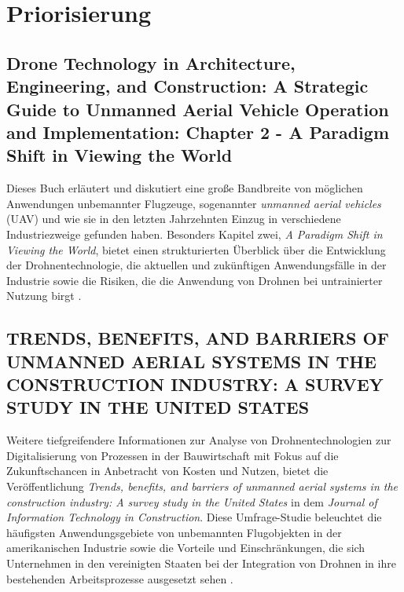 \chapter{Priorisierung}\label{ch:priorisation}

\section{Drone Technology in Architecture, Engineering, and Construction: A Strategic Guide to Unmanned Aerial Vehicle Operation and Implementation: Chapter 2 - A Paradigm Shift in Viewing the World}

Dieses Buch erläutert und diskutiert eine große Bandbreite von möglichen Anwendungen unbemannter Flugzeuge, sogenannter \textit{unmanned aerial vehicles} (UAV) und wie sie in den letzten Jahrzehnten Einzug in verschiedene Industriezweige gefunden haben.
Besonders Kapitel zwei, \textit{A Paradigm Shift in Viewing the World}, bietet einen strukturierten Überblick über die Entwicklung der Drohnentechnologie, die aktuellen und zukünftigen Anwendungsfälle in der Industrie sowie die Risiken, die die Anwendung von Drohnen bei untrainierter Nutzung birgt \cite{Tal2021}.

\section{TRENDS, BENEFITS, AND BARRIERS OF UNMANNED AERIAL SYSTEMS IN THE CONSTRUCTION INDUSTRY: A SURVEY STUDY IN THE UNITED STATES}

Weitere tiefgreifendere Informationen zur Analyse von Drohnentechnologien zur Digitalisierung von Prozessen in der Bauwirtschaft mit Fokus auf die Zukunftschancen in Anbetracht von Kosten und Nutzen, bietet die Veröffentlichung \textit{Trends, benefits, and barriers of unmanned aerial systems in the construction industry: A survey study in the United States} in dem \textit{Journal of Information Technology in Construction}.
Diese Umfrage-Studie beleuchtet die häufigsten Anwendungsgebiete von unbemannten Flugobjekten in der amerikanischen Industrie sowie die Vorteile und Einschränkungen, die sich Unternehmen in den vereinigten Staaten bei der Integration von Drohnen in ihre bestehenden Arbeitsprozesse ausgesetzt sehen \cite{abaeano2021trends}.